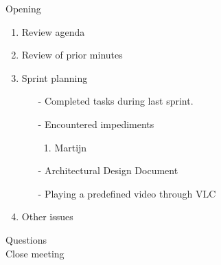 \documentclass[pdftex, 12pt, a4paper]{report}
\begin{document}
\pagestyle{fancy}

Opening

\begin{enumerate}
\item Review agenda			
\item Review of prior minutes
\item Sprint planning
\begin{enumerate}
\item[-] Completed tasks during last sprint.
\item[-] Encountered impediments
\begin{enumerate}
	\item Martijn
\end{enumerate}
\item[-] Architectural Design Document
\item[-] Playing a predefined video through VLC
\end{enumerate}
\item Other issues
\end{enumerate}

Questions\\

Close meeting
\end{document}
